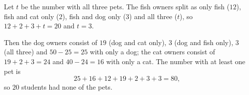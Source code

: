 Let $t$ be the number with all three pets. The fish owners split as only fish ($12$), fish and cat only ($2$), fish and dog only ($3$) and all three ($t$), so $12+2+3+t=20$ and $t=3$.

Then the dog owners consist of $19$ (dog and cat only), $3$ (dog and fish only), $3$ (all three) and $50-25=25$ with only a dog; the cat owners consist of $19+2+3=24$ and $40-24=16$ with only a cat. The number with at least one pet is
\[25+16+12+19+2+3+3=80,\]
so $\boxed{20}$ students had none of the pets.

